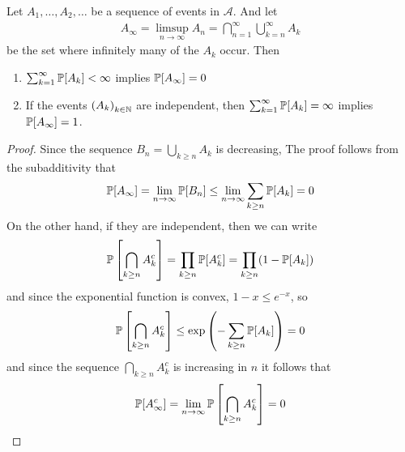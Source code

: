 \begin{lem}
Let $A_1,\ldots,A_2, \ldots$ be a sequence of events in $\mathcal{A}$. And let
\begin{align*}
  A_{\infty} = \limsup_{n \to \infty}A_n = \bigcap_{n=1}^{\infty}\bigcup_{k=n}^{\infty}A_k
\end{align*}
be the set where infinitely many of the $A_k$ occur. Then
\begin{enumerate}
  \item $\sum_{k=1}^{\infty}\mathbb{P}[A_k] < \infty$ implies $\mathbb{P}[A_{\infty}] = 0$
  \item If the events $\left(A_{k}\right)_{k \in \mathbb{N}}$ are independent, then $\sum_{k=1}^{\infty}\mathbb{P}[A_k] = \infty$ implies $\mathbb{P}[A_{\infty}] = 1$.
\end{enumerate}
\end{lem}
\begin{proof}
  Since the sequence $B_n = \bigcup_{k \geq n}A_k$ is decreasing, 
The proof follows from the subadditivity that
\begin{align*}
  \mathbb{P}[A_{\infty}] = \lim_{n \to \infty}\mathbb{P}[B_n] \leq \lim_{n \to \infty}\sum_{k \geq n}\mathbb{P}[A_k] = 0
\end{align*}
On the other hand, if they are independent, then we can write
\begin{align*}
  \mathbb{P}\left[\bigcap_{k \geq n}A_k^{c}\right]
  =
  \prod_{k\geq n}\mathbb{P}[A_k^{c}]
  =
  \prod_{k\geq n}(1 - \mathbb{P}[A_k])
\end{align*}
and since the exponential function is convex, $1 - x \leq e^{-x}$, so \begin{align*}
  \mathbb{P}\left[
\bigcap_{k \geq n}A_k^{c}
  \right]
  \leq
  \exp \left(
    - \sum_{k \geq n} \mathbb{P}[A_k]
  \right)
   = 0
\end{align*}
and since the sequence $\bigcap_{k \geq n}A_k^{c}$ is increasing in $n$ it follows that
\begin{align*}
  \mathbb{P}[A_{\infty}^{c}] = \lim_{n \to \infty} \mathbb{P}\left[\bigcap_{k \geq n}A_k^{c}\right]= 0
\end{align*}
\end{proof}
